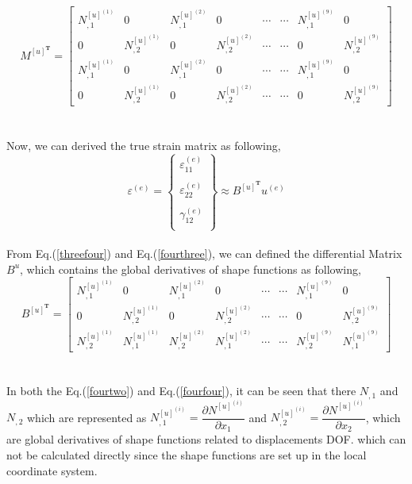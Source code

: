 \documentclass[12pt]{article}
\begin{document}
\begin{equation}\label{fourtwo}
M^{[u]^\textbf{T}}=
\begin{bmatrix}
N_{,1}^{[u]^{(1)}}&0&N_{,1}^{[u]^{(2)}}&0&\cdots &\cdots& N_{,1}^{[u]^{(9)}}&0 \\
0&N_{,2}^{[u]^{(1)}}&0&N_{,2}^{[u]^{(2)}}&\cdots &\cdots& 0&N_{,2}^{[u]^{(9)}} \\
N_{,1}^{[u]^{(1)}}&0&N_{,1}^{[u]^{(2)}}&0&\cdots &\cdots& N_{,1}^{[u]^{(9)}}&0 \\
0&N_{,2}^{[u]^{(1)}}&0&N_{,2}^{[u]^{(2)}}&\cdots &\cdots& 0&N_{,2}^{[u]^{(9)}}
\end{bmatrix}
\end{equation}
\\
\\
Now, we can derived the true strain matrix as following,
\begin{equation}\label{fourthree}
\varepsilon^{(e)}=
\begin{Bmatrix}
\varepsilon_{11}^{(e)} \\
\\
\varepsilon_{22}^{(e)}  \\
\\
\gamma_{12}^{(e)}  \\ 
\end{Bmatrix}
\approx B^{[u]^{\textbf{T}}}u^{(e)}
\end{equation}
\\
From Eq.(\ref{threefour}) and Eq.(\ref{fourthree}), we can defined the differential Matrix $B^u$, which contains the global derivatives of shape functions as following, 
\begin{equation}\label{fourfour}
B^{[u]^\textbf{T}}=
\begin{bmatrix}
	N_{,1}^{[u]^{(1)}}&0&N_{,1}^{[u]^{(2)}}&0&\cdots &\cdots& N_{,1}^{[u]^{(9)}}&0 \\
	0&N_{,2}^{[u]^{(1)}}&0&N_{,2}^{[u]^{(2)}}&\cdots &\cdots& 0&N_{,2}^{[u]^{(9)}} \\
	N_{,2}^{[u]^{(1)}}&N_{,1}^{[u]^{(1)}}&N_{,2}^{[u]^{(2)}}&N_{,1}^{[u]^{(2)}}&\cdots &\cdots& N_{,2}^{[u]^{(9)}}&N_{,1}^{[u]^{(9)}}
\end{bmatrix}
\end{equation}
\\
\\
In both the Eq.(\ref{fourtwo}) and Eq.(\ref{fourfour}), it can be seen that there $N_{,1}$ and $N_{,2}$ which are represented as $N_{,1}^{[u]^{(i)}} = \dfrac{\partial N^{[u]^{(i)}}}{\partial x_1}$ and $N_{,2}^{[u]^{(i)}} = \dfrac{\partial N^{[u]^{(i)}}}{\partial x_2}$, which are global derivatives of shape functions related to displacements DOF. which can not be calculated directly since the shape functions are set up in the local coordinate system.
\end{document}
